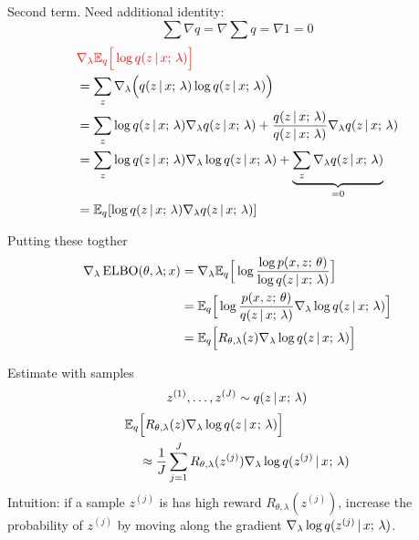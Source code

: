 \begin{frame}
Second term. Need additional identity:
\[\sum \nabla q = \nabla \sum q = \nabla 1 = 0 \]
\vspace{-5mm}
\begin{align*}
    &{\color{red} \nabla_\lambda  \mathbb{E}_{q}\Big[\log q(z \,|\, x ; \, \lambda) \Big] }\\
    &= \sum_{z} \nabla_\lambda \Big ( q(z \,|\, x; \, \lambda) \log q(z \,|\, x ; \, \lambda)\Big) \\
    & = \sum_{z}  \log q(z \,|\, x ; \, \lambda) \nabla_\lambda q(z \,|\, x ; \, \lambda) +  \frac{q(z \,|\, x ; \, \lambda)}{q(z \,|\, x ; \, \lambda)}\nabla_\lambda q(z \,|\, x ; \, \lambda) \\
    &= \sum_{z}  \log q(z \,|\, x ; \, \lambda) \nabla_\lambda \log q(z \,|\, x ; \, \lambda) + \underbrace{\sum_z \nabla_\lambda q(z \,|\, x ; \, \lambda)}_{= 0} \\
    &= \mathbb{E}_{q}[\log q (z \,|\, x ; \, \lambda) \nabla_\lambda q (z \,|\, x ; \, \lambda)]
\end{align*}
\end{frame}

\begin{frame}
Putting these togther
\begin{align*}
       \nabla_\lambda \operatorname*{ELBO}(\theta, \lambda ; x) &=  \nabla_\lambda \mathbb{E}_q \Big[\log \frac{\log p(x, z ; \, \theta)}{\log q (z \,|\, x ; \, \lambda)} \Big]\\
       &= \mathbb{E}_q \Big[\log \frac{p(x, z ; \, \theta)}{q(z \,|\, x ; \, \lambda)} \nabla_\lambda \log q ( z \,|\, x ; \, \lambda ) \Big] \\
       &= \mathbb{E}_q \Big[R_{\theta, \lambda}(z) \nabla_\lambda \log q ( z \,|\, x ; \, \lambda ) \Big]
\end{align*}
\end{frame}

\begin{frame}
Estimate with samples 
\[ z^{(1)}, \dots, z^{(J)} \sim q(z \,|\, x^{} ; \, \lambda) \]
\begin{align*}
        \mathbb{E}_{q}&\Big[ R_{\theta, \lambda}(z)  \nabla_\lambda \log q(z \,|\, x^{} ; \, \lambda) \Big] \\ &\approx \frac{1}{J}\sum_{j=1}^J R_{\theta, \lambda}(z^{(j)})  \nabla_\lambda \log q(z^{(j)} \,|\, x^{} ; \, \lambda)
\end{align*}
Intuition: if a sample $z^{(j)}$ is has high reward $R_{\theta, \lambda}(z^{(j)})$,
increase the probability of $z^{(j)}$
by moving along the gradient $\nabla_\lambda \log q(z^{(j)} \,|\, x ; \, \lambda)$.
\end{frame}

